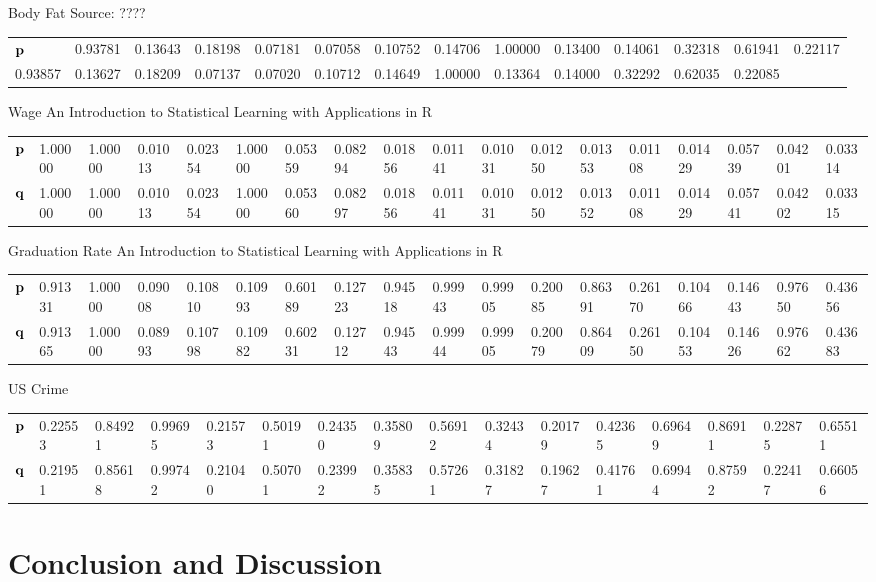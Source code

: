 \documentclass{amsart}[12pt]
\begin{document}
Body Fat
Source: ????

\begin{tabular}{llllllllllllll}
${\bf p}$ & 0.93781&0.13643&0.18198&0.07181&0.07058&0.10752&0.14706&1.00000&0.13400&0.14061&0.32318&0.61941&0.22117\\
0.93857&0.13627&0.18209&0.07137&0.07020&0.10712&0.14649&1.00000&0.13364&0.14000&0.32292&0.62035&0.22085\\
\end{tabular}

Wage
An Introduction to Statistical Learning with Applications in R

\begin{tabular}{llllllllllllllllll}
${\bf p}$ & 1.00000&1.00000&0.01013&0.02354&1.00000&0.05359&0.08294&0.01856&0.01141&0.01031&0.01250&0.01353&0.01108&0.01429&0.05739&0.04201&0.03314\\
${\bf q}$ & 1.00000&1.00000&0.01013&0.02354&1.00000&0.05360&0.08297&0.01856&0.01141&0.01031&0.01250&0.01352&0.01108&0.01429&0.05741&0.04202&0.03315\\
\end{tabular}

Graduation Rate
An Introduction to Statistical Learning with Applications in R

\begin{tabular}{llllllllllllllllll}
${\bf p}$ & 0.91331&1.00000&0.09008&0.10810&0.10993&0.60189&0.12723&0.94518&0.99943&0.99905&0.20085&0.86391&0.26170&0.10466&0.14643&0.97650&0.43656\\
${\bf q}$ & 0.91365&1.00000&0.08993&0.10798&0.10982&0.60231&0.12712&0.94543&0.99944&0.99905&0.20079&0.86409&0.26150&0.10453&0.14626&0.97662&0.43683\\
\end{tabular}

US Crime

\begin{tabular}{llllllllllllllll}
${\bf p}$ & 0.22553&0.84921&0.99695&0.21573&0.50191&0.24350&0.35809&0.56912&0.32434&0.20179&0.42365&0.69649&0.86911&0.22875&0.65511\\
${\bf q}$ & 0.21951&0.85618&0.99742&0.21040&0.50701&0.23992&0.35835&0.57261&0.31827&0.19627&0.41761&0.69944&0.87592&0.22417&0.66056\\
\end{tabular}

\section{Conclusion and Discussion}
\label{sec:conclusion}



\end{document}
